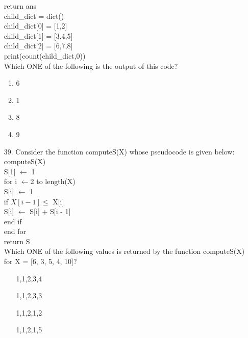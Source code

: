 \documentclass[journal]{IEEEtran}
\begin{document}
\begin{enumerate}
     return ans\\
    child\_dict = dict()\\
    child\_dict[0] = [1,2]\\
    child\_dict[1] = [3,4,5]\\
    child\_dict[2] = [6,7,8]\\
    print(count(child\_dict,0))\\
    Which ONE of the following is the output of this code?
    \begin{enumerate}[label = (\Alph*)]
        \item 6
        \item 1
        \item 8
        \item 9 
    \end{enumerate}
    \item[39.]  Consider the function computeS(X) whose pseudocode is given below:
    computeS(X)\\
    S[1] $\leftarrow$ 1\\
    for i $\leftarrow$2 to length(X)\\
     S[i] $\leftarrow$ 1\\
     if $X[i - 1] \leq$ X[i]\\
     S[i] $\leftarrow$ S[i] + S[i - 1]\\
     end if\\
    end for\\
    return S\\
    Which ONE of the following values is returned by the function computeS(X)
    for X = [6, 3, 5, 4, 10]?
    \begin{enumerate}[label = (\Alph*) ]
        \item [1,1,2,3,4]
        \item [1,1,2,3,3]
        \item [1,1,2,1,2]
        \item [1,1,2,1,5]
    \end{enumerate}

\end{enumerate}
\end{document}
